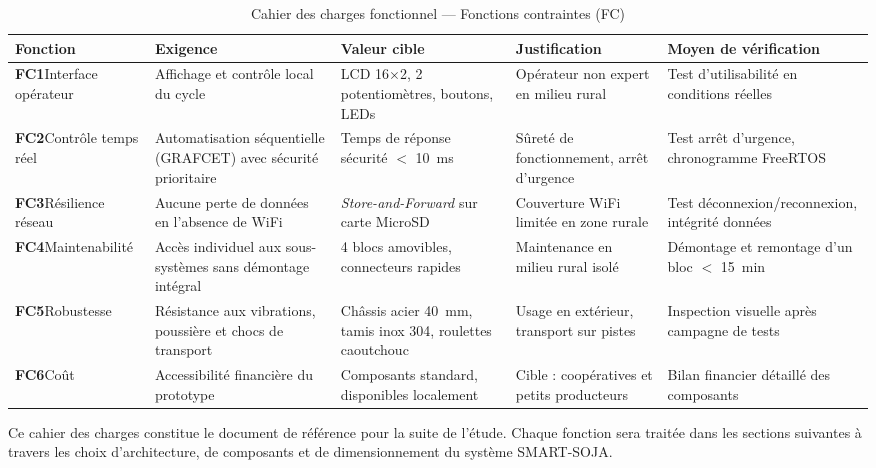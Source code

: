 \begin{table}[H]
    \caption{Cahier des charges fonctionnel — Fonctions contraintes (FC)}
    \label{tab:cdc_fc}
    \centering
\footnotesize
\renewcommand{\arraystretch}{1.5}
\begin{tabularx}{\textwidth}{|p{2.3cm}|L|p{2.1cm}|L|L|}
\hline
{}
\textbf{Fonction} & \textbf{Exigence} & \textbf{Valeur cible} & \textbf{Justification} & \textbf{Moyen de vérification} \\ \hline

\textbf{FC1}\newline Interface opérateur &
Affichage et contrôle local du cycle &
LCD 16$\times$2, 2 potentiomètres, boutons, LEDs &
Opérateur non expert en milieu rural &
Test d'utilisabilité en conditions réelles \\ \hline

\textbf{FC2}\newline Contrôle temps réel &
Automatisation séquentielle (GRAFCET) avec sécurité prioritaire &
Temps de réponse sécurité $<$ 10~ms &
Sûreté de fonctionnement, arrêt d'urgence &
Test arrêt d'urgence, chronogramme FreeRTOS \\ \hline

\textbf{FC3}\newline Résilience réseau &
Aucune perte de données en l'absence de WiFi &
\textit{Store-and-Forward} sur carte MicroSD &
Couverture WiFi limitée en zone rurale &
Test déconnexion/reconnexion, intégrité données \\ \hline

\textbf{FC4}\newline Maintenabilité &
Accès individuel aux sous-systèmes sans démontage intégral &
4 blocs amovibles, connecteurs rapides &
Maintenance en milieu rural isolé &
Démontage et remontage d'un bloc $<$ 15~min \\ \hline

\textbf{FC5}\newline Robustesse &
Résistance aux vibrations, poussière et chocs de transport &
Châssis acier 40~mm, tamis inox 304, roulettes caoutchouc &
Usage en extérieur, transport sur pistes &
Inspection visuelle après campagne de tests \\ \hline

\textbf{FC6}\newline Coût &
Accessibilité financière du prototype &
Composants standard, disponibles localement &
Cible : coopératives et petits producteurs &
Bilan financier détaillé des composants \\ \hline

\end{tabularx}
\end{table}

Ce cahier des charges constitue le document de référence pour la suite de l'étude. Chaque fonction sera traitée dans les sections suivantes à travers les choix d'architecture, de composants et de dimensionnement du système SMART-SOJA.

